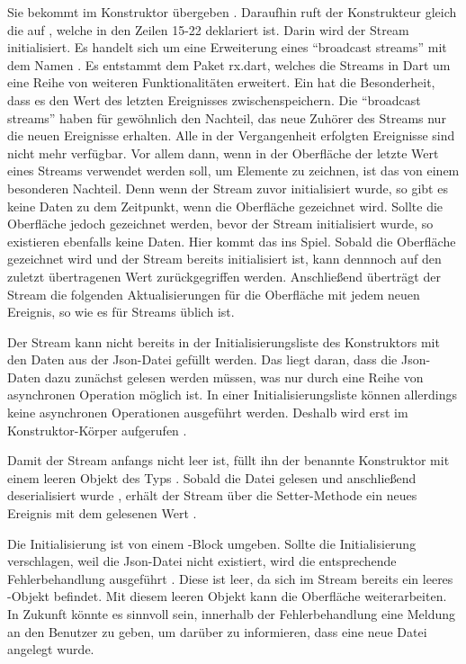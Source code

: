 Sie bekommt  im Konstruktor übergeben . Daraufhin ruft der Konstrukteur gleich die  auf , welche in den Zeilen 15-22 deklariert ist. Darin wird der Stream   initialisiert. Es handelt sich um eine Erweiterung eines \enquote{broadcast streams} mit dem Namen  . Es entstammt dem Paket rx.dart, welches die Streams in Dart um eine Reihe von weiteren Funktionalitäten erweitert. Ein  hat die Besonderheit, dass es den Wert des letzten Ereignisses zwischenspeichern. Die \enquote{broadcast streams} haben für gewöhnlich den Nachteil, das neue Zuhörer des Streams nur die neuen Ereignisse erhalten. Alle in der Vergangenheit erfolgten Ereignisse sind nicht mehr verfügbar. Vor allem dann, wenn in der Oberfläche der letzte Wert eines Streams verwendet werden soll, um Elemente zu zeichnen, ist das von einem besonderen Nachteil. Denn wenn der Stream zuvor initialisiert wurde, so gibt es keine Daten zu dem Zeitpunkt, wenn die Oberfläche gezeichnet wird. Sollte die Oberfläche jedoch gezeichnet werden, bevor der Stream initialisiert wurde, so  existieren ebenfalls keine Daten. Hier kommt das  ins Spiel. Sobald die Oberfläche gezeichnet wird und der Stream bereits initialisiert ist, kann dennnoch auf den zuletzt übertragenen Wert zurückgegriffen werden. Anschließend überträgt der Stream die folgenden Aktualisierungen für die Oberfläche mit jedem neuen Ereignis, so wie es für Streams üblich ist.

Der Stream kann nicht bereits in der Initialisierungsliste des Konstruktors mit den Daten aus der Json-Datei gefüllt werden. Das liegt daran, dass die Json-Daten dazu zunächst gelesen werden müssen, was nur durch eine Reihe von asynchronen Operation möglich ist. In einer Initialisierungsliste können allerdings keine asynchronen Operationen ausgeführt werden. Deshalb wird  erst im Konstruktor-Körper aufgerufen . 

Damit der Stream anfangs nicht leer ist, füllt ihn der benannte Konstruktor  mit einem leeren Objekt des Typs  . Sobald die Datei gelesen  und anschließend deserialisiert wurde , erhält der Stream über die Setter-Methode  ein neues Ereignis mit dem gelesenen Wert .

Die Initialisierung ist von einem -Block umgeben. Sollte die Initialisierung verschlagen, weil die Json-Datei nicht existiert, wird die entsprechende Fehlerbehandlung ausgeführt . Diese ist leer, da sich im Stream bereits ein leeres -Objekt  befindet. Mit diesem leeren Objekt kann die Oberfläche weiterarbeiten. In Zukunft könnte es sinnvoll sein, innerhalb der Fehlerbehandlung eine Meldung an den Benutzer zu geben, um darüber zu informieren, dass eine neue Datei angelegt wurde.

